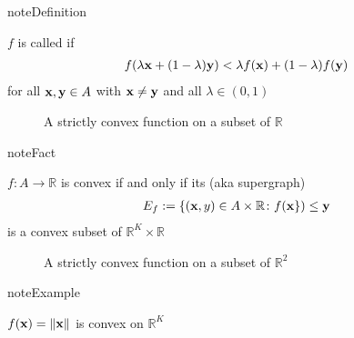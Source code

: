 \documentclass[letterpaper,10pt,english]{jupyterBook}
\begin{document}
\begin{sphinxadmonition}{note}{Definition}

\sphinxAtStartPar
\(f\) is called  if
\begin{equation*}
\begin{split}
%
f(\lambda {\bf x} + (1 - \lambda) {\bf y})
< \lambda f({\bf x}) + (1 - \lambda) f({\bf y})
%
\end{split}
\end{equation*}
\sphinxAtStartPar
for all \({\bf x}, {\bf y} \in A\) with \({\bf x} \ne {\bf y}\) and all \(\lambda \in (0, 1)\)
\end{sphinxadmonition}

\begin{figure}[htbp]
\centering
\capstart

\noindent{}
\caption{A strictly convex function on a subset of \(\mathbb{R}\)}\label{\detokenize{06.optimization_fundamentals:id7}}\end{figure}

\begin{sphinxadmonition}{note}{Fact}

\sphinxAtStartPar
\(f \colon A \to \mathbb{R}\) is convex if and only if its  (aka supergraph)
\begin{equation*}
\begin{split}
%
E_f := \{ ({\bf x}, y) \in A \times \mathbb{R} \colon f({\bf x \}) \leq y}
%
\end{split}
\end{equation*}
\sphinxAtStartPar
is a convex subset of \(\mathbb{R}^K \times \mathbb{R}\)
\end{sphinxadmonition}

\begin{figure}[htbp]
\centering

\noindent{}
\end{figure}

\begin{figure}[htbp]
\centering
\capstart

\noindent{}
\caption{A strictly convex function on a subset of \(\mathbb{R}^2\)}\label{\detokenize{06.optimization_fundamentals:id8}}\end{figure}

\begin{sphinxadmonition}{note}{Example}

\sphinxAtStartPar
\(f({\bf x}) = \|{\bf x}\|\) is convex on \(\mathbb{R}^K\)
\end{sphinxadmonition}
\end{document}
